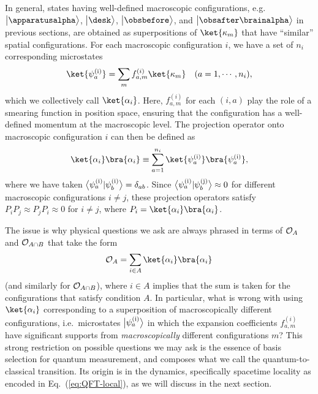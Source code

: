 \documentclass[12pt]{article}
\begin{document}
In general, states having well-defined macroscopic configurations, e.g.\ 
$\bigl|\apparatusalpha\bigr>$, $\bigl|\desk\bigr>$, $\bigl|\obsbefore\bigr>$, 
and $\bigl|\obsafter\brainalpha\bigr>$ in previous sections, are obtained 
as superpositions of $\ket{\kappa_m}$ that have ``similar'' spatial 
configurations.  For each macroscopic configuration $i$, we have a set 
of $n_i$ corresponding microstates
%
\begin{equation}
  \ket{\psi^{\rm (i)}_a} = \sum_m f_{a,m}^{(i)} \ket{\kappa_m}
  \quad (a = 1,\cdots,n_i),
\label{eq:psi-ia}
\end{equation}
%
which we collectively call $\ket{\alpha_i}$.  Here, $f_{a,m}^{(i)}$ for 
each $(i,a)$ play the role of a smearing function in position space, 
ensuring that the configuration has a well-defined momentum at the 
macroscopic level.  The projection operator onto macroscopic configuration 
$i$ can then be defined as
%
\begin{equation}
  \ket{\alpha_i} \bra{\alpha_i} \equiv 
    \sum_{a=1}^{n_i} \ket{\psi^{\rm (i)}_a} \bra{\psi^{\rm (i)}_a},
\label{eq:project-i}
\end{equation}
%
where we have taken $\bigl< \psi^{\rm (i)}_a | \psi^{\rm (i)}_b \bigr> 
= \delta_{ab}$.  Since $\bigl< \psi^{\rm (i)}_a | \psi^{\rm (j)}_b \bigr> 
\approx 0$ for different macroscopic configurations $i \neq j$, these 
projection operators satisfy $P_i P_j \approx P_j P_i \approx 0$ for 
$i \neq j$, where $P_i = \ket{\alpha_i} \bra{\alpha_i}$.

The issue is why physical questions we ask are always phrased in 
terms of ${\cal O}_A$ and ${\cal O}_{A \cap B}$ that take the form
%
\begin{equation}
  {\cal O}_A = \sum_{i \in A} \ket{\alpha_i} \bra{\alpha_i}
\label{eq:O_A-local}
\end{equation}
%
(and similarly for ${\cal O}_{A \cap B}$), where $i \in A$ implies 
that the sum is taken for the configurations that satisfy condition $A$. 
In particular, what is wrong with using $\ket{\alpha_i}$ corresponding 
to a superposition of macroscopically different configurations, i.e.\ 
microstates $\bigl| \psi^{\rm (i)}_a \bigr>$ in which the expansion 
coefficients $f_{a,m}^{(i)}$ have significant supports from {\it 
macroscopically} different configurations $m$?  This strong restriction 
on possible questions we may ask is the essence of basis selection for 
quantum measurement, and composes what we call the quantum-to-classical 
transition.  Its origin is in the dynamics, specifically spacetime 
locality as encoded in Eq.~(\ref{eq:QFT-local}), as we will discuss 
in the next section.
\end{document}
